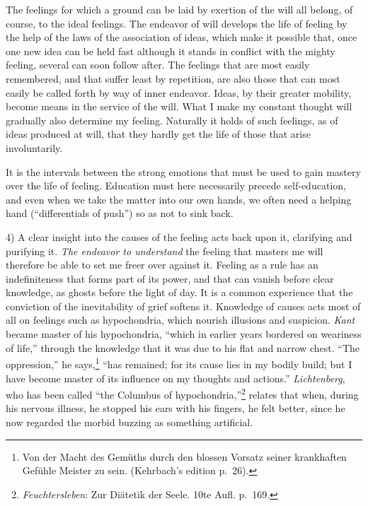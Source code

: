\documentclass[12pt,a4paper]{book}
\newcommand{\opage}[1]{\marginnote{\footnotesize\textit{[#1]}}}
\begin{document}
The feelings for which a ground can be laid by exertion of the will all
belong, of course, to the ideal feelings. The endeavor of will develops
the life of feeling by the help of the laws of the association of ideas,
which make it possible that, once one new idea can be held fast although
it stands in conflict with the mighty feeling, several can soon follow
after. The feelings that are most easily remembered, and that suffer least
by repetition, are also those that can most easily be called forth by way
of inner endeavor. Ideas, by their greater mobility, become means in the
service of the will. What I make my constant thought will gradually also
determine my feeling. Naturally it holds of such feelings, as of ideas
produced at will, that they hardly get the life of those that arise
involuntarily.

It is the intervals between the strong emotions that must be used to gain
mastery over the life of feeling. Education must here necessarily precede
self-education, and even when we take the matter into our own hands, we
often need a helping hand (``differentials of push'') so as not to sink
back.

4) A clear insight into the causes of the feeling acts back upon it,
clarifying and purifying it. \emph{The endeavor to understand} the feeling
that masters me will therefore be able to set me freer over against it.
Feeling as a rule has an indefiniteness that forms part of its power, and
that can vanish before
\opage{390}clear knowledge, as ghosts before the light of day. It is a
common experience that the conviction of the inevitability of grief
softens it. Knowledge of causes acts most of all on feelings such as
hypochondria, which nourish illusions and suspicion. \emph{Kant} became
master of his hypochondria, ``which in earlier years bordered on
weariness of life,'' through the knowledge that it was due to his flat
and narrow chest.
``The oppression,'' he says,\footnote{Von der Macht des Gemüths durch
den blossen Vorsatz seiner krankhaften Gefühle Meister zu sein.
(Kehrbach’s edition p.~26).} ``has remained; for its cause lies in my
bodily build; but I have become master of its influence on my thoughts
and actions.'' \emph{Lichtenberg}, who has been called
``the Columbus of hypochondria,''\footnote{\emph{Feuchtersleben}: Zur
Diätetik der Seele. 10te Aufl. p.~169.} relates that when, during his
nervous illness, he stopped his ears with his fingers, he felt better,
since he now regarded the morbid buzzing as something artificial.
\end{document}

